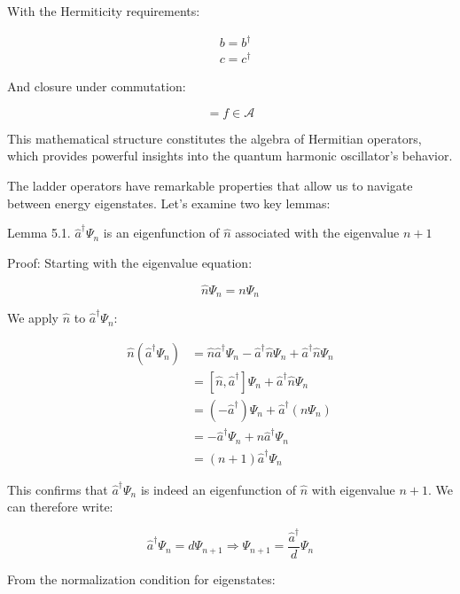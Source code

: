 \documentclass[italian]{HKNdocument}
\begin{document}
With the Hermiticity requirements:

\begin{align}
&b = b^\dagger \\
&c = c^\dagger \label{eq:5.20}
\end{align}

And closure under commutation:

\begin{equation}
[b,c] = f \in \mathcal{A} \label{eq:5.21}
\end{equation}

This mathematical structure constitutes the algebra of Hermitian operators, which provides powerful insights into the quantum harmonic oscillator's behavior.

The ladder operators have remarkable properties that allow us to navigate between energy eigenstates. Let's examine two key lemmas:

Lemma 5.1. $\hat{a}^\dagger\Psi_n$ is an eigenfunction of $\hat{n}$ associated with the eigenvalue $n+1$

Proof:
Starting with the eigenvalue equation:

\begin{equation}
\hat{n}\Psi_n = n\Psi_n \label{eq:5.22}
\end{equation}

We apply $\hat{n}$ to $\hat{a}^\dagger\Psi_n$:

\begin{align}
\hat{n}(\hat{a}^\dagger\Psi_n) &= \hat{n}\hat{a}^\dagger\Psi_n - \hat{a}^\dagger\hat{n}\Psi_n + \hat{a}^\dagger\hat{n}\Psi_n \\
&= [\hat{n}, \hat{a}^\dagger]\Psi_n + \hat{a}^\dagger\hat{n}\Psi_n \\
&= (-\hat{a}^\dagger)\Psi_n + \hat{a}^\dagger(n\Psi_n) \label{eq:5.23} \\
&= -\hat{a}^\dagger\Psi_n + n\hat{a}^\dagger\Psi_n \\
&= (n+1)\hat{a}^\dagger\Psi_n
\end{align}

This confirms that $\hat{a}^\dagger\Psi_n$ is indeed an eigenfunction of $\hat{n}$ with eigenvalue $n+1$. We can therefore write:

\begin{equation}
\hat{a}^\dagger\Psi_n = d\Psi_{n+1} \Longrightarrow \Psi_{n+1} = \frac{\hat{a}^\dagger}{d}\Psi_n \label{eq:5.24}
\end{equation}


From the normalization condition for eigenstates:
\end{document}
